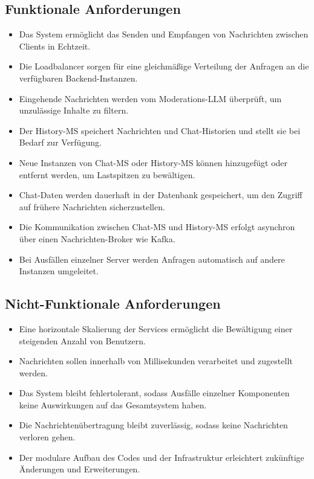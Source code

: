 \documentclass[12pt]{report}
\begin{document}
\subsection{Funktionale Anforderungen}
\begin{itemize}
	\item Das System ermöglicht das Senden und Empfangen von Nachrichten zwischen Clients in Echtzeit.
	\item Die Loadbalancer sorgen für eine gleichmäßige Verteilung der Anfragen an die verfügbaren Backend-Instanzen.
	\item Eingehende Nachrichten werden vom Moderations-LLM überprüft, um unzulässige Inhalte zu filtern.
	\item Der History-MS speichert Nachrichten und Chat-Historien und stellt sie bei Bedarf zur Verfügung.
	\item Neue Instanzen von Chat-MS oder History-MS können hinzugefügt oder entfernt werden, um Lastspitzen zu bewältigen.
	\item Chat-Daten werden dauerhaft in der Datenbank gespeichert, um den Zugriff auf frühere Nachrichten sicherzustellen.
	\item Die Kommunikation zwischen Chat-MS und History-MS erfolgt asynchron über einen Nachrichten-Broker wie Kafka.
	\item Bei Ausfällen einzelner Server werden Anfragen automatisch auf andere Instanzen umgeleitet.
\end{itemize}

\subsection{Nicht-Funktionale Anforderungen}
\begin{itemize}
	\item Eine horizontale Skalierung der Services ermöglicht die Bewältigung einer steigenden Anzahl von Benutzern.
	\item Nachrichten sollen innerhalb von Millisekunden verarbeitet und zugestellt werden.
	\item Das System bleibt fehlertolerant, sodass Ausfälle einzelner Komponenten keine Auswirkungen auf das Gesamtsystem haben.
	\item Die Nachrichtenübertragung bleibt zuverlässig, sodass keine Nachrichten verloren gehen.
	\item Der modulare Aufbau des Codes und der Infrastruktur erleichtert zukünftige Änderungen und Erweiterungen.
\end{itemize}
\end{document}

